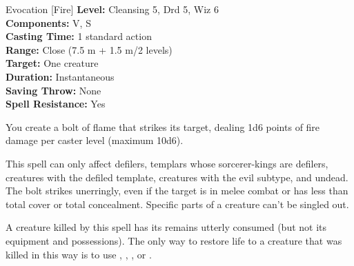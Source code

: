{Evocation [Fire]}
{
	\textbf{Level:}
	Cleansing 5, Drd 5, Wiz 6\\
	\textbf{Components:}
	V, S\\
	\textbf{Casting Time:}
	1 standard action\\
	\textbf{Range:}
	Close (7.5 m + 1.5 m/2 levels)\\
	\textbf{Target:}
	One creature\\
	\textbf{Duration:}
	Instantaneous\\
	\textbf{Saving Throw:}
	None\\
	\textbf{Spell Resistance:}
	Yes\\
}
{
	You create a bolt of flame that strikes its target, dealing 1d6 points of fire damage per caster level (maximum 10d6).

	This spell can only affect defilers, templars whose sorcerer-kings are defilers, creatures with the defiled template, creatures with the evil subtype, and undead. The bolt strikes unerringly, even if the target is in melee combat or has less than total cover or total concealment. Specific parts of a creature can't be singled out.

	A creature killed by this spell has its remains utterly consumed (but not its equipment and possessions). The only way to restore life to a creature that was killed in this way is to use , , , or .
}
